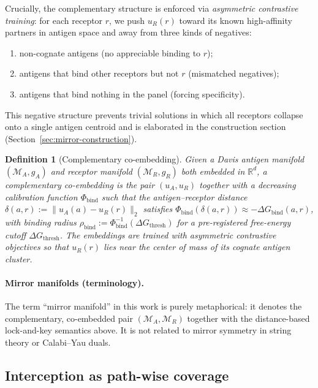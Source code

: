 \documentclass[11pt]{article}
\newcommand{\M}{\mathcal{M}}
\newtheorem{definition}{Definition}
\begin{document}
Crucially, the complementary structure is enforced via \emph{asymmetric contrastive training}: for each receptor $r$, we push $u_R(r)$ toward its known high-affinity partners in antigen space and away from three kinds of negatives:
\begin{enumerate}
  \item non-cognate antigens (no appreciable binding to $r$);
  \item antigens that bind other receptors but not $r$ (mismatched negatives);
  \item antigens that bind nothing in the panel (forcing specificity).
\end{enumerate}
This negative structure prevents trivial solutions in which all receptors collapse onto a single antigen centroid and is elaborated in the construction section (Section~\ref{sec:mirror-construction}).

\begin{definition}[Complementary co-embedding]
\label{def:complementary-coembedding}
Given a Davis antigen manifold $(\M_A,g_A)$ and receptor manifold $(\M_R,g_R)$ both embedded in $\mathbb{R}^d$, a \emph{complementary co-embedding} is the pair $(u_A,u_R)$ together with a decreasing calibration function $\Phi_{\mathrm{bind}}$ such that the antigen--receptor distance $\delta(a,r) := \|u_A(a)-u_R(r)\|_2$ satisfies $\Phi_{\mathrm{bind}}(\delta(a,r)) \approx -\Delta G_{\mathrm{bind}}(a,r)$, with binding radius $\rho_{\mathrm{bind}} := \Phi_{\mathrm{bind}}^{-1}(\Delta G_{\mathrm{thresh}})$ for a pre-registered free-energy cutoff $\Delta G_{\mathrm{thresh}}$. The embeddings are trained with asymmetric contrastive objectives so that $u_R(r)$ lies near the center of mass of its cognate antigen cluster.
\end{definition}

\paragraph{Mirror manifolds (terminology).}
The term ``mirror manifold'' in this work is purely metaphorical: it denotes the complementary, co-embedded pair $(\M_A,\M_R)$ together with the distance-based lock-and-key semantics above. It is not related to mirror symmetry in string theory or Calabi--Yau duals.

\subsection{Interception as path-wise coverage}
\label{sec:interception-coverage}
\end{document}

